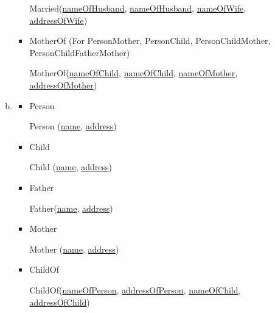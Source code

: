 \documentclass[12pt]{article}
\begin{document}
\begin{enumerate}[1.]
\begin{enumerate}[a)]
\begin{itemize}
            \quad Married(\underline{nameOfHusband}, \underline{nameOfHusband},
                    \underline{nameOfWife}, \underline{addressOfWife})

            \bigskip

            \item MotherOf (For PersonMother, PersonChild, PersonChildMother, \\ PersonChildFatherMother)

            \bigskip

            \quad MotherOf(\underline{nameOfChild}, \underline{nameOfChild},
                    \underline{nameOfMother}, \underline{addressOfMother})

            \bigskip
        \end{itemize}

        \item


        \begin{itemize}
            \item Person

            \bigskip

            \quad Person (\underline{name}, \underline{address})

            \bigskip

            \item Child

            \bigskip

            \quad Child (\underline{name}, \underline{address})

            \bigskip

            \item Father

            \bigskip

            \quad Father(\underline{name}, \underline{address})

            \bigskip

            \item Mother

            \bigskip

            \quad Mother (\underline{name}, \underline{address})

            \bigskip

            \item ChildOf

            \bigskip

            \quad ChildOf(\underline{nameOfPerson}, \underline{addressOfPerson},
                    \underline{nameOfChild}, \underline{addressOfChild})


\end{itemize}
\end{enumerate}
\end{enumerate}
\end{document}
